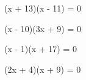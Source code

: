 \begin{pageenonces}
    \begin{tcolorbox}[carteenonce={17}]
        (x + 13)(x - 11) = 0
    \end{tcolorbox}
    \begin{tcolorbox}[carteenonce={18}]
        (x - 10)(3x + 9) = 0
    \end{tcolorbox}
    \begin{tcolorbox}[carteenonce={19}]
        (x - 1)(x + 17) = 0
    \end{tcolorbox}
    \begin{tcolorbox}[carteenonce={20}]
        (2x + 4)(x + 9) = 0
    \end{tcolorbox}
\end{pageenonces}

